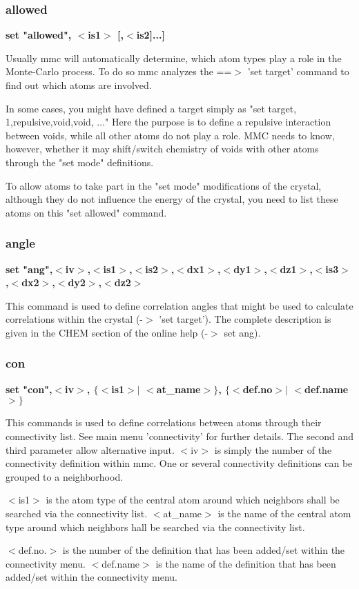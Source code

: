 \subsubsection{allowed}
{\bf set "allowed", $ <$is1$> $ [,$ <$is2]...] \par }
\par
\vspace{3pt}
Usually mmc will automatically determine, which atom types play 
a role in the Monte-Carlo process. To do so mmc analyzes the 
==$> $ 'set target' command to find out which atoms are involved. 
\par
In some cases, you might have defined a target simply as 
"set target, 1,repulsive,void,void, ..." 
Here the purpose is to define a repulsive interaction between 
voids, while all other atoms do not play a role. 
MMC needs to know, however, whether it may shift/switch chemistry 
of voids with other atoms through the "set mode" definitions. 
\par
To allow atoms to take part in the "set mode" modifications of 
the crystal, although they do not influence the energy of the 
crystal, you need to list these atoms on this "set allowed" 
command. 
\subsubsection{angle}
{\bf set "ang",$ <$iv$> $,$ <$is1$> $,$ <$is2$> $,$ <$dx1$> $,$ <$dy1$> $,$ <$dz1$> $,$ <$is3$> $,$ <$dx2$> $,$ <$dy2$> $,$ <$dz2$> $ \par }
\par
\vspace{3pt}
This command is used to define correlation angles that might be used 
to calculate correlations within the crystal (-$> $ 'set target'). The 
complete description is given in the CHEM section of the online 
help (-$> $ set ang). 
\subsubsection{con}
{\bf set "con",$ <$iv$> $, $ \{$$ <$is1$> $$| $ $ <$at\_name$> $$\} $, $ \{$$ <$def.no$> $$| $ $ <$def.name$> $$\} $ \par }
\par
\vspace{3pt}
This commands is used to define correlations between atoms through 
their connectivity list. See main menu 'connectivity' for further 
details. The second and third parameter allow alternative input. 
$ <$iv$> $  is simply the number of the connectivity definition within mmc. 
      One or several connectivity definitions can be grouped 
      to a neighborhood. 
\par
$ <$is1$> $ is the atom type of the central atom around which neighbors 
      shall be searched via the connectivity list. 
$ <$at\_name$> $ is the name of the central atom type around which 
      neighbors hall be searched via the connectivity list. 
\par
$ <$def.no.$> $ is the number of the definition that has been added/set 
      within the connectivity menu. 
$ <$def.name$> $ is the name of the definition that has been added/set 
      within the connectivity menu. 
